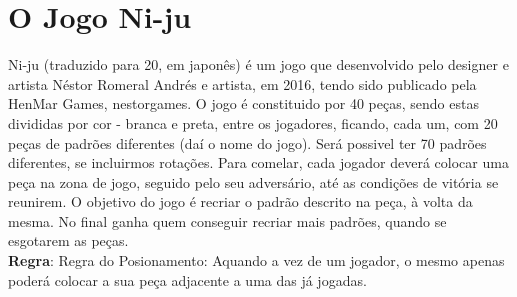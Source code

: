 \documentclass[a4paper]{article}
\begin{document}

\newpage

%
%
%
%
%
%
%


\section{O Jogo Ni-ju}

Ni-ju (traduzido para 20, em japonês) é um jogo que desenvolvido pelo designer e artista Néstor Romeral Andrés e artista, em 2016, tendo sido publicado pela HenMar Games, nestorgames.
O jogo é constituido por 40 peças, sendo estas divididas por cor - branca e preta, entre os jogadores, ficando, cada um, com 20 peças de padrões diferentes (daí o nome do jogo). Será possivel ter 70 padrões diferentes, se incluirmos rotações.
Para comelar, cada jogador deverá colocar uma peça na zona de jogo, seguido pelo seu adversário, até as condições de vitória se reunirem.
O objetivo do jogo é recriar o padrão descrito na peça, à volta da mesma. No final ganha quem conseguir recriar mais padrões, quando se esgotarem as peças.
\linebreak\linebreak\\
\textbf{Regra}:
Regra do Posionamento: 
  Aquando a vez de um jogador, o mesmo apenas poderá colocar a sua peça adjacente a uma das já jogadas.
\linebreak\linebreak\\
\end{document}
